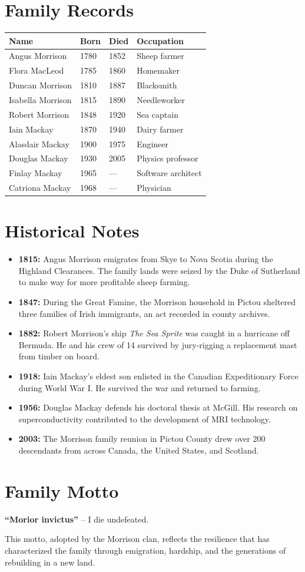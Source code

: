 \documentclass[
    language=english,
    doctype=family-tree,
    institution=none,
]{../../omnilatex}
\begin{document}
\section{Family Records}

\begin{center}
\begin{tabular}{|l|l|l|l|}
\hline
\textbf{Name} & \textbf{Born} & \textbf{Died} & \textbf{Occupation} \\
\hline
Angus Morrison & 1780 & 1852 & Sheep farmer \\
Flora MacLeod & 1785 & 1860 & Homemaker \\
Duncan Morrison & 1810 & 1887 & Blacksmith \\
Isabella Morrison & 1815 & 1890 & Needleworker \\
Robert Morrison & 1848 & 1920 & Sea captain \\
Iain Mackay & 1870 & 1940 & Dairy farmer \\
Alasdair Mackay & 1900 & 1975 & Engineer \\
Douglas Mackay & 1930 & 2005 & Physics professor \\
Finlay Mackay & 1965 & --- & Software architect \\
Catriona Mackay & 1968 & --- & Physician \\
\hline
\end{tabular}
\end{center}

\section{Historical Notes}

\begin{itemize}
    \item \textbf{1815:} Angus Morrison emigrates from Skye to Nova Scotia during the Highland Clearances. The family lands were seized by the Duke of Sutherland to make way for more profitable sheep farming.
    \item \textbf{1847:} During the Great Famine, the Morrison household in Pictou sheltered three families of Irish immigrants, an act recorded in county archives.
    \item \textbf{1882:} Robert Morrison's ship \emph{The Sea Sprite} was caught in a hurricane off Bermuda. He and his crew of 14 survived by jury-rigging a replacement mast from timber on board.
    \item \textbf{1918:} Iain Mackay's eldest son enlisted in the Canadian Expeditionary Force during World War I. He survived the war and returned to farming.
    \item \textbf{1956:} Douglas Mackay defends his doctoral thesis at McGill. His research on superconductivity contributed to the development of MRI technology.
    \item \textbf{2003:} The Morrison family reunion in Pictou County drew over 200 descendants from across Canada, the United States, and Scotland.
\end{itemize}

\section{Family Motto}

\textbf{``Morior invictus''} -- I die undefeated.

This motto, adopted by the Morrison clan, reflects the resilience that has characterized the family through emigration, hardship, and the generations of rebuilding in a new land.
\end{document}
